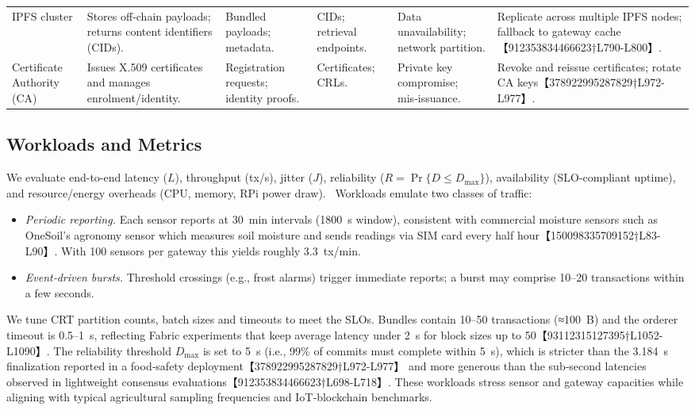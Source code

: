 \begin{table*}[!t]
\begin{tabular}{p{2.5cm}p{3cm}p{2.7cm}p{2.7cm}p{3cm}p{3cm}}
    IPFS cluster & Stores off‑chain payloads; returns content identifiers (CIDs). & Bundled payloads; metadata. & CIDs; retrieval endpoints. & Data unavailability; network partition. & Replicate across multiple IPFS nodes; fallback to gateway cache【912353834466623†L790-L800】. \\
    Certificate Authority (CA) & Issues X.509 certificates and manages enrolment/identity. & Registration requests; identity proofs. & Certificates; CRLs. & Private key compromise; mis‑issuance. & Revoke and reissue certificates; rotate CA keys【378922995287829†L972-L977】. \\
    \bottomrule
  \end{tabular}
\end{table*}

\subsection{Workloads and Metrics}
We evaluate end-to-end latency ($L$), throughput (tx/s), jitter ($J$), reliability ($R=\Pr\{D\le D_{\max}\}$), availability (SLO-compliant uptime), and resource/energy overheads (CPU, memory, RPi power draw).\ %
Workloads emulate two classes of traffic:
\begin{itemize}
  \item \emph{Periodic reporting.}  Each sensor reports at 30~min intervals (1800~s window), consistent with commercial moisture sensors such as OneSoil’s agronomy sensor which measures soil moisture and sends readings via SIM card every half hour【150098335709152†L83-L90】.  With 100 sensors per gateway this yields roughly 3.3~tx/min.
  \item \emph{Event‑driven bursts.}  Threshold crossings (e.g., frost alarms) trigger immediate reports; a burst may comprise 10–20 transactions within a few seconds.
\end{itemize}
We tune CRT partition counts, batch sizes and timeouts to meet the SLOs.  Bundles contain 10–50 transactions (≈100~B) and the orderer timeout is 0.5–1~s, reflecting Fabric experiments that keep average latency under 2~s for block sizes up to 50【93112315127395†L1052-L1090】.  The reliability threshold $D_{\max}$ is set to 5~s (i.e., 99\% of commits must complete within 5~s), which is stricter than the 3.184~s finalization reported in a food‑safety deployment【378922995287829†L972-L977】 and more generous than the sub‑second latencies observed in lightweight consensus evaluations【912353834466623†L698-L718】.  These workloads stress sensor and gateway capacities while aligning with typical agricultural sampling frequencies and IoT‑blockchain benchmarks.

